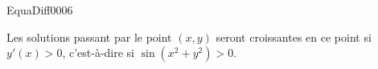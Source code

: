\begin{corrige}{EquaDiff0006}

Les solutions passant par le point $(x,y)$ seront croissantes en ce point si $y'(x)>0$, c'est-à-dire si $\sin(x^2+y^2)>0$.

%

\end{corrige}
